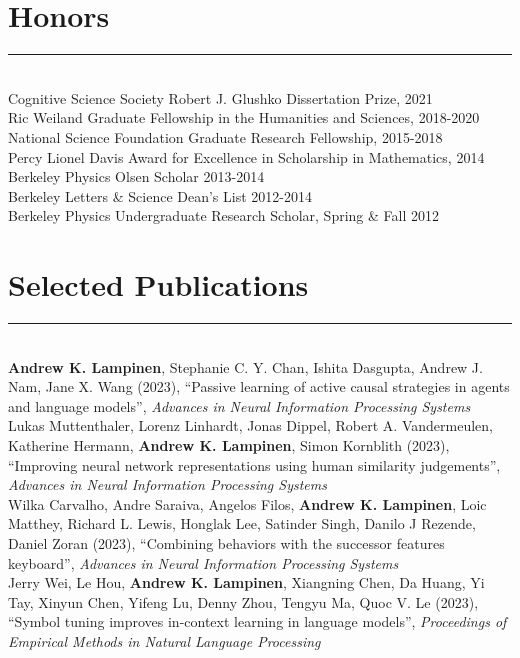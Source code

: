 \documentclass[margin]{res}
\begin{document}
\begin{resume}
\section{Honors} \vspace{-15pt} \rule{\textwidth}{0.5pt} \\[3pt]
Cognitive Science Society Robert J. Glushko Dissertation Prize, 2021 \\
Ric Weiland Graduate Fellowship in the Humanities and Sciences, 2018-2020 \\
National Science Foundation Graduate Research Fellowship, 2015-2018 \\
Percy Lionel Davis Award for Excellence in Scholarship in Mathematics, 2014 \\ 
Berkeley Physics Olsen Scholar 2013-2014 \\
Berkeley Letters \& Science Dean's List 2012-2014\\
Berkeley Physics Undergraduate Research Scholar, Spring \& Fall 2012
\vspace{1pt}\section{Selected Publications} \vspace{-15pt} \rule{\textwidth}{0.5pt} \\[3pt]
\textbf{Andrew K. Lampinen}, Stephanie C. Y. Chan, Ishita Dasgupta, Andrew J. Nam, Jane X. Wang (2023), {``Passive learning of active causal strategies in agents and language models'',} \textit{Advances in Neural Information Processing Systems} \\[3pt]
Lukas Muttenthaler, Lorenz Linhardt, Jonas Dippel, Robert A. Vandermeulen, Katherine Hermann, \textbf{Andrew K. Lampinen}, Simon Kornblith (2023), {``Improving neural network representations using human similarity judgements'',} \textit{Advances in Neural Information Processing Systems} \\[3pt]
Wilka Carvalho, Andre Saraiva, Angelos Filos, \textbf{Andrew K. Lampinen}, Loic Matthey, Richard L. Lewis, Honglak Lee, Satinder Singh, Danilo J Rezende, Daniel Zoran (2023), {``Combining behaviors with the successor features keyboard''}, \textit{Advances in Neural Information Processing Systems} \\[3pt]
Jerry Wei, Le Hou, \textbf{Andrew K. Lampinen}, Xiangning Chen, Da Huang, Yi Tay, Xinyun Chen, Yifeng Lu, Denny Zhou, Tengyu Ma, Quoc V. Le (2023), {``Symbol tuning improves in-context learning in language models'',} \textit{Proceedings of Empirical Methods in Natural Language Processing} \\[3pt]

\end{resume}
\end{document}
